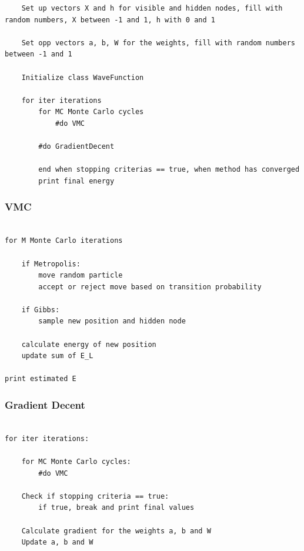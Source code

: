 \documentclass[norsk,a4paper,12pt]{article}
\begin{document}
\begin{lstlisting}
	Set up vectors X and h for visible and hidden nodes, fill with random numbers, X between -1 and 1, h with 0 and 1
	
	Set opp vectors a, b, W for the weights, fill with random numbers between -1 and 1
	
	Initialize class WaveFunction
	
	for iter iterations
		for MC Monte Carlo cycles
			#do VMC
		
		#do GradientDecent
		
		end when stopping criterias == true, when method has converged
		print final energy
\end{lstlisting}

\subsubsection{VMC}

\lstset{basicstyle=\scriptsize}
\begin{lstlisting}

for M Monte Carlo iterations
	
	if Metropolis:
		move random particle
		accept or reject move based on transition probability
		
	if Gibbs:
		sample new position and hidden node
		
	calculate energy of new position
	update sum of E_L

print estimated E 

\end{lstlisting}

\subsubsection{Gradient Decent}

\lstset{basicstyle=\scriptsize}
\begin{lstlisting}

for iter iterations:
	
	for MC Monte Carlo cycles:
		#do VMC
		
	Check if stopping criteria == true:
		if true, break and print final values
		
	Calculate gradient for the weights a, b and W
	Update a, b and W

\end{lstlisting}
\end{document}
